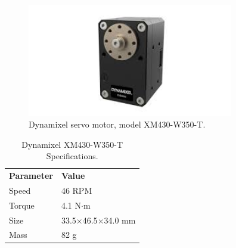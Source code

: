 \begin{figure}[t]
  \centering
  \includegraphics[width=90mm]{./fig/chap2/dxl.jpeg}
  \vspace{2mm}
  \caption{Dynamixel servo motor, model XM430-W350-T.}\label{DXL}
\end{figure}
\smallskip
\begin{table}[t]
    \centering
    \caption{Dynamixel XM430-W350-T Specifications.}
    \label{dynamixel_spec}
    \begin{tabular}{|l|l|}
        \hline
        \rowcolor[HTML]{EFEFEF}
        \multicolumn{2}{|c|}{\cellcolor[HTML]{EFEFEF}\textbf{Specifications}} \\ \hline
        \textbf{Parameter} & \textbf{Value} \\ \hline
        Speed & 46 RPM \\ \hline
        Torque & 4.1 N$\cdot$m  \\ \hline
        Size & 33.5$\times$46.5$\times$34.0 mm \\ \hline
        Mass & 82 g \\ \hline
    \end{tabular}
\end{table}
\smallskip

